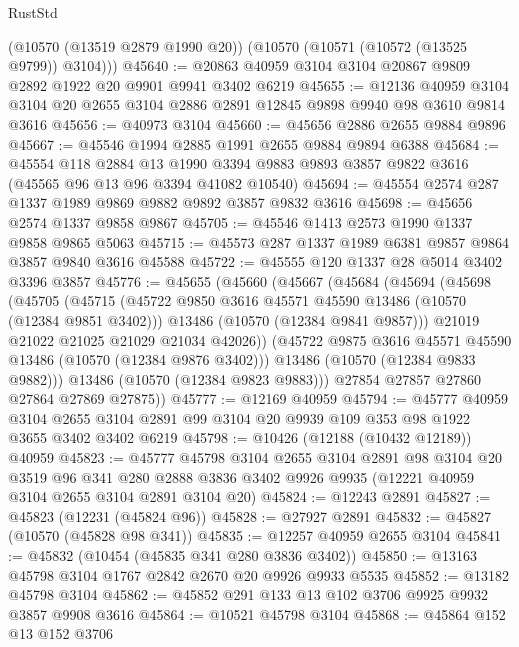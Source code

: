 \begin{lexlean}{RustStd}
\begin{coremodule}
      (@10570 (@13519 @2879 @1990 @20))
      (@10570 (@10571 (@10572 (@13525 @9799)) @3104)))
@45640 := @20863 @40959 @3104 @3104 @20867 @9809 @2892 @1922 @20 @9901 @9941 @3402 @6219
@45655 := @12136
    @40959
    @3104
    @3104
    @20
    @2655
    @3104
    @2886
    @2891
    @12845
    @9898
    @9940
    @98
    @3610
    @9814
    @3616
@45656 := @40973 @3104
@45660 := @45656 @2886 @2655 @9884 @9896
@45667 := @45546 @1994 @2885 @1991 @2655 @9884 @9894 @6388
@45684 := @45554
    @118
    @2884
    @13
    @1990
    @3394
    @9883
    @9893
    @3857
    @9822
    @3616
    (@45565 @96 @13 @96 @3394 @41082 @10540)
@45694 := @45554 @2574 @287 @1337 @1989 @9869 @9882 @9892 @3857 @9832 @3616
@45698 := @45656 @2574 @1337 @9858 @9867
@45705 := @45546 @1413 @2573 @1990 @1337 @9858 @9865 @5063
@45715 := @45573 @287 @1337 @1989 @6381 @9857 @9864 @3857 @9840 @3616 @45588
@45722 := @45555 @120 @1337 @28 @5014 @3402 @3396 @3857
@45776 := @45655
    (@45660
      (@45667
        (@45684
          (@45694
            (@45698
              (@45705
                (@45715
                  (@45722 @9850 @3616 @45571 @45590 @13486 (@10570 (@12384 @9851 @3402)))
                  @13486
                  (@10570 (@12384 @9841 @9857)))
                @21019
                @21022
                @21025
                @21029
                @21034
                @42026))
            (@45722 @9875 @3616 @45571 @45590 @13486 (@10570 (@12384 @9876 @3402)))
            @13486
            (@10570 (@12384 @9833 @9882)))
          @13486
          (@10570 (@12384 @9823 @9883)))
        @27854
        @27857
        @27860
        @27864
        @27869
        @27875))
@45777 := @12169 @40959
@45794 := @45777
    @40959
    @3104
    @2655
    @3104
    @2891
    @99
    @3104
    @20
    @9939
    @109
    @353
    @98
    @1922
    @3655
    @3402
    @3402
    @6219
@45798 := @10426 (@12188 (@10432 @12189)) @40959
@45823 := @45777
    @45798
    @3104
    @2655
    @3104
    @2891
    @98
    @3104
    @20
    @3519
    @96
    @341
    @280
    @2888
    @3836
    @3402
    @9926
    @9935
    (@12221 @40959 @3104 @2655 @3104 @2891 @3104 @20)
@45824 := @12243 @2891
@45827 := @45823 (@12231 (@45824 @96))
@45828 := @27927 @2891
@45832 := @45827 (@10570 (@45828 @98 @341))
@45835 := @12257 @40959 @2655 @3104
@45841 := @45832 (@10454 (@45835 @341 @280 @3836 @3402))
@45850 := @13163 @45798 @3104 @1767 @2842 @2670 @20 @9926 @9933 @5535
@45852 := @13182 @45798 @3104
@45862 := @45852 @291 @133 @13 @102 @3706 @9925 @9932 @3857 @9908 @3616
@45864 := @10521 @45798 @3104
@45868 := @45864 @152 @13 @152 @3706

\end{coremodule}
\end{lexlean}
